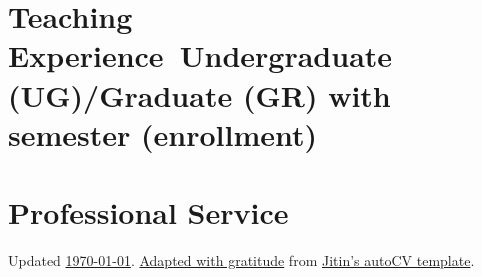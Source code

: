 \documentclass[11pt]{article}
\begin{document}
\section*[Teaching Experience]{Teaching Experience\ \small Undergraduate (UG)/Graduate (GR) with semester (enrollment)}
%


\section*[Professional Service]{Professional Service}


\vfill
{\footnotesize Updated \href{https://cv.matthewlew.info}{\today}. \href{https://github.com/mdlew/autoCV_MDL}{Adapted with gratitude} from \href{https://github.com/jitinnair1/autoCV}{Jitin's autoCV template}.}
\end{document}
